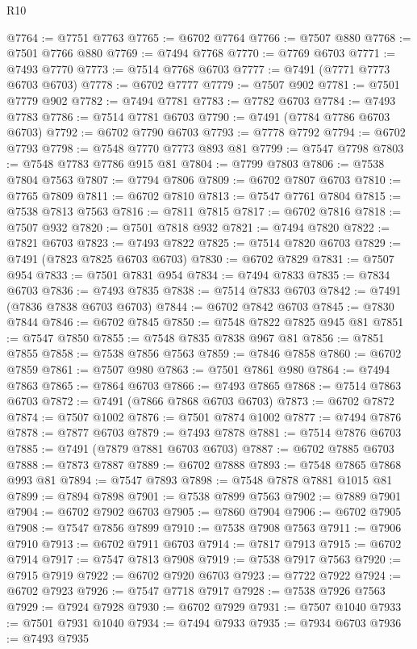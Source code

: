 \begin{lexlean}{R10}
\begin{coremodule}
@7764 := @7751 @7763
@7765 := @6702 @7764
@7766 := @7507 @880
@7768 := @7501 @7766 @880
@7769 := @7494 @7768
@7770 := @7769 @6703
@7771 := @7493 @7770
@7773 := @7514 @7768 @6703
@7777 := @7491 (@7771 @7773 @6703 @6703)
@7778 := @6702 @7777
@7779 := @7507 @902
@7781 := @7501 @7779 @902
@7782 := @7494 @7781
@7783 := @7782 @6703
@7784 := @7493 @7783
@7786 := @7514 @7781 @6703
@7790 := @7491 (@7784 @7786 @6703 @6703)
@7792 := @6702 @7790 @6703
@7793 := @7778 @7792
@7794 := @6702 @7793
@7798 := @7548 @7770 @7773 @893 @81
@7799 := @7547 @7798
@7803 := @7548 @7783 @7786 @915 @81
@7804 := @7799 @7803
@7806 := @7538 @7804 @7563
@7807 := @7794 @7806
@7809 := @6702 @7807 @6703
@7810 := @7765 @7809
@7811 := @6702 @7810
@7813 := @7547 @7761 @7804
@7815 := @7538 @7813 @7563
@7816 := @7811 @7815
@7817 := @6702 @7816
@7818 := @7507 @932
@7820 := @7501 @7818 @932
@7821 := @7494 @7820
@7822 := @7821 @6703
@7823 := @7493 @7822
@7825 := @7514 @7820 @6703
@7829 := @7491 (@7823 @7825 @6703 @6703)
@7830 := @6702 @7829
@7831 := @7507 @954
@7833 := @7501 @7831 @954
@7834 := @7494 @7833
@7835 := @7834 @6703
@7836 := @7493 @7835
@7838 := @7514 @7833 @6703
@7842 := @7491 (@7836 @7838 @6703 @6703)
@7844 := @6702 @7842 @6703
@7845 := @7830 @7844
@7846 := @6702 @7845
@7850 := @7548 @7822 @7825 @945 @81
@7851 := @7547 @7850
@7855 := @7548 @7835 @7838 @967 @81
@7856 := @7851 @7855
@7858 := @7538 @7856 @7563
@7859 := @7846 @7858
@7860 := @6702 @7859
@7861 := @7507 @980
@7863 := @7501 @7861 @980
@7864 := @7494 @7863
@7865 := @7864 @6703
@7866 := @7493 @7865
@7868 := @7514 @7863 @6703
@7872 := @7491 (@7866 @7868 @6703 @6703)
@7873 := @6702 @7872
@7874 := @7507 @1002
@7876 := @7501 @7874 @1002
@7877 := @7494 @7876
@7878 := @7877 @6703
@7879 := @7493 @7878
@7881 := @7514 @7876 @6703
@7885 := @7491 (@7879 @7881 @6703 @6703)
@7887 := @6702 @7885 @6703
@7888 := @7873 @7887
@7889 := @6702 @7888
@7893 := @7548 @7865 @7868 @993 @81
@7894 := @7547 @7893
@7898 := @7548 @7878 @7881 @1015 @81
@7899 := @7894 @7898
@7901 := @7538 @7899 @7563
@7902 := @7889 @7901
@7904 := @6702 @7902 @6703
@7905 := @7860 @7904
@7906 := @6702 @7905
@7908 := @7547 @7856 @7899
@7910 := @7538 @7908 @7563
@7911 := @7906 @7910
@7913 := @6702 @7911 @6703
@7914 := @7817 @7913
@7915 := @6702 @7914
@7917 := @7547 @7813 @7908
@7919 := @7538 @7917 @7563
@7920 := @7915 @7919
@7922 := @6702 @7920 @6703
@7923 := @7722 @7922
@7924 := @6702 @7923
@7926 := @7547 @7718 @7917
@7928 := @7538 @7926 @7563
@7929 := @7924 @7928
@7930 := @6702 @7929
@7931 := @7507 @1040
@7933 := @7501 @7931 @1040
@7934 := @7494 @7933
@7935 := @7934 @6703
@7936 := @7493 @7935

\end{coremodule}
\end{lexlean}
